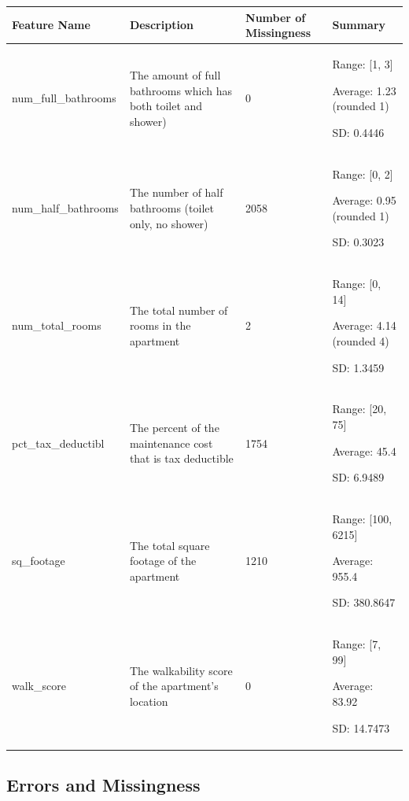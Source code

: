 \documentclass[12pt]{article}
\begin{document}
\begin{table}[H]
    \centering
    \begin{tabular}{|p{3.5cm}|p{5.5cm}|p{2cm}|p{4cm}|}
     \hline
        Feature Name & Description & Number of Missingness & Summary \\

        \hline
        
        num\_full\_bathrooms & The amount of full bathrooms which has both toilet and shower) & 0 & Range: [1, 3]
        
Average: 1.23 (rounded 1)

SD: 0.4446 

\\
\hline
        num\_half\_bathrooms & The number of half bathrooms (toilet only, no shower) & 2058 & Range: [0, 2]

Average: 0.95 (rounded 1)

SD: 0.3023 \\ 
\hline
num\_total\_rooms & The total number of rooms in the apartment & 2 & Range: [0, 14]

Average: 4.14 (rounded 4)

SD: 1.3459 \\
\hline

pct\_tax\_deductibl & The percent of the maintenance cost that is tax deductible & 1754 & Range: [20, 75]

Average: 45.4 

SD: 6.9489 \\
\hline

sq\_footage & The total square footage of the apartment & 1210 & Range: [100, 6215]

Average: 955.4

SD: 380.8647 \\
\hline

walk\_score & The walkability score of the apartment's location & 0 & Range: [7, 99]

Average: 83.92 

SD: 14.7473 \\

\hline
    \end{tabular}
\end{table}













\subsection{Errors and Missingness}
\end{document}
